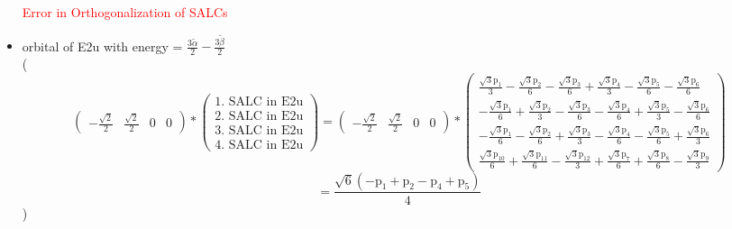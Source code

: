 \documentclass[12pt,a4paper]{article}
\begin{document}
\begin{itemize}
\textcolor{red}{Error in Orthogonalization of SALCs}\item orbital of E2u with energy = 
                                $\frac{3 \tilde{\alpha}}{2} - \frac{3 \tilde{\beta}}{2}$ \\
( 
$$
\begin{pmatrix}- \frac{\sqrt{2}}{2} & \frac{\sqrt{2}}{2} & 0 & 0\end{pmatrix} * \left(\begin{array}{c}\text{1. SALC in E2u} \\ \text{2. SALC in E2u} \\ \text{3. SALC in E2u} \\ \text{4. SALC in E2u}\end{array}\right) = \begin{pmatrix}- \frac{\sqrt{2}}{2} & \frac{\sqrt{2}}{2} & 0 & 0\end{pmatrix} * \begin{pmatrix}\frac{\sqrt{3} \text{p}_{1}}{3} - \frac{\sqrt{3} \text{p}_{2}}{6} - \frac{\sqrt{3} \text{p}_{3}}{6} + \frac{\sqrt{3} \text{p}_{4}}{3} - \frac{\sqrt{3} \text{p}_{5}}{6} - \frac{\sqrt{3} \text{p}_{6}}{6}\\- \frac{\sqrt{3} \text{p}_{1}}{6} + \frac{\sqrt{3} \text{p}_{2}}{3} - \frac{\sqrt{3} \text{p}_{3}}{6} - \frac{\sqrt{3} \text{p}_{4}}{6} + \frac{\sqrt{3} \text{p}_{5}}{3} - \frac{\sqrt{3} \text{p}_{6}}{6}\\- \frac{\sqrt{3} \text{p}_{1}}{6} - \frac{\sqrt{3} \text{p}_{2}}{6} + \frac{\sqrt{3} \text{p}_{3}}{3} - \frac{\sqrt{3} \text{p}_{4}}{6} - \frac{\sqrt{3} \text{p}_{5}}{6} + \frac{\sqrt{3} \text{p}_{6}}{3}\\\frac{\sqrt{3} \text{p}_{10}}{6} + \frac{\sqrt{3} \text{p}_{11}}{6} - \frac{\sqrt{3} \text{p}_{12}}{3} + \frac{\sqrt{3} \text{p}_{7}}{6} + \frac{\sqrt{3} \text{p}_{8}}{6} - \frac{\sqrt{3} \text{p}_{9}}{3}\end{pmatrix} 
 $$ $$ = \frac{\sqrt{6} \left(- \text{p}_{1} + \text{p}_{2} - \text{p}_{4} + \text{p}_{5}\right)}{4} 
 $$ 
 )


\end{itemize}
\end{document}
